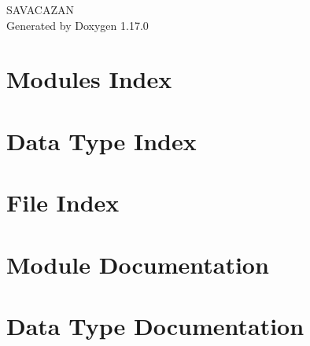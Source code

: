 \documentclass[twoside]{book}
\newcommand{\+}{\discretionary{\mbox{\scriptsize$\hookleftarrow$}}{}{}}
\newcommand{\clearemptydoublepage}{%
    \newpage{\pagestyle{empty}\cleardoublepage}%
  }
\begin{document}
  \raggedbottom
    \hypersetup{pageanchor=false,
                bookmarksnumbered=true,
                pdfencoding=unicode
               }
  \begin{titlepage}
  \vspace*{7cm}
  \begin{center}%
  {\Large SAVACAZAN}\\
  \vspace*{1cm}
  {\large Generated by Doxygen 1.17.0}\\
  \end{center}
  \end{titlepage}
  \clearemptydoublepage
  \tableofcontents
  \clearemptydoublepage
  \hypersetup{pageanchor=true}









\chapter{Modules Index}

\chapter{Data Type Index}

\chapter{File Index}

\chapter{Module Documentation}






\chapter{Data Type Documentation}





\end{document}
